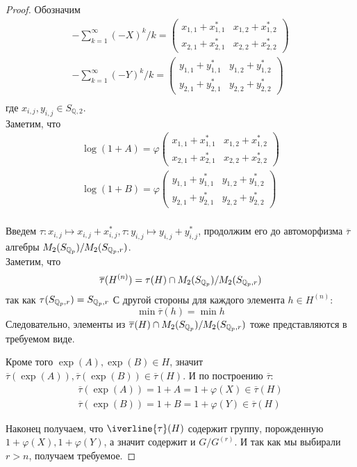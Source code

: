 \begin{proof}
    Обозначим
    \begin{gather*}
        -\sum\limits_{k=1}^{\infty} (-X)^k / k =
        \begin{pmatrix}
            x_{1,1} + x_{1,1}^* & x_{1,2} + x_{1,2}^* \\
            x_{2,1} + x_{2,1}^* & x_{2,2} + x_{2,2}^*
        \end{pmatrix}\\
        -\sum\limits_{k=1}^{\infty} (-Y)^k / k =
        \begin{pmatrix}
            y_{1,1} + y_{1,1}^* & y_{1,2} + y_{1,2}^* \\
            y_{2,1} + y_{2,1}^* & y_{2,2} + y_{2,2}^*
        \end{pmatrix}\\
    \end{gather*}
    где $x_{i,j}, y_{i,j} \in S_{\mathbb{Q}, 2}$.\\
    Заметим, что
    \begin{gather*}
        \log(1 + A) = \varphi
        \begin{pmatrix}
            x_{1,1} + x_{1,1}^* & x_{1,2} + x_{1,2}^* \\
            x_{2,1} + x_{2,1}^* & x_{2,2} + x_{2,2}^*
        \end{pmatrix}\\
        \log(1 + B) = \varphi
        \begin{pmatrix}
            y_{1,1} + y_{1,1}^* & y_{1,2} + y_{1,2}^* \\
            y_{2,1} + y_{2,1}^* & y_{2,2} + y_{2,2}^*
        \end{pmatrix}\\
    \end{gather*}

    Введем $\tau: x_{i,j}\mapsto x_{i,j} + x_{i,j}^*, \tau: y_{i,j}\mapsto y_{i,j} + y_{i,j}^*$, продолжим его до автоморфизма $\overline{\tau}$ алгебры
    $M_2(S_{\mathbb{Q}_p})/M_2(S_{\mathbb{Q}_p, r})$.\\
    Заметим, что
    \[
        \overline{\tau}(H^{(n)}) = \tau(H)\cap M_2(S_{\mathbb{Q}_p})/M_2(S_{\mathbb{Q}_p, r})
    \]
    так как $\tau(S_{\mathbb{Q}_p, r}) = S_{\mathbb{Q}_p, r}$
    С другой стороны для каждого элемента $h\in H^{(n)}$:
    \[
        \min \overline{\tau}(h) = \min h
    \]
    Следовательно, элементы из $\overline{\tau}(H)\cap M_2(S_{\mathbb{Q}_p})/M_2(S_{\mathbb{Q}_p, r})$ тоже представляются в требуемом виде.

    Кроме того $\exp{(A)}, \exp{(B)} \in H$, значит $\overline{\tau}(\exp{(A)}), \overline{\tau}(\exp{(B)}) \in \overline{\tau}(H)$.
    И по построению $\overline{\tau}$:
    \begin{gather*}
        \overline{\tau}(\exp{(A)}) = 1 + A = 1 + \varphi(X) \in \overline{\tau}(H)\\
        \overline{\tau}(\exp{(B)}) = 1 + B = 1 + \varphi(Y) \in \overline{\tau}(H)
    \end{gather*}

    Наконец получаем, что $\iverline{\tau}(H)$ содержит группу, порожденную $1 + \varphi(X), 1 + \varphi(Y)$, а значит содержит и $G/G^{(r)}$.
    И так как мы выбирали $r > n$, получаем требуемое.

\end{proof}

